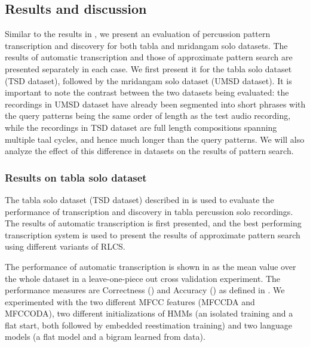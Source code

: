 \subsection{Results and discussion}
Similar to the results in , we present an evaluation of percussion pattern transcription and discovery for both \gls{tabla} and mridangam solo datasets. The results of automatic transcription and those of approximate pattern search are presented separately in each case. We first present it for the \gls{tabla} solo dataset (\acrshort{TSD} dataset), followed by the mridangam solo dataset (\acrshort{UMSD} dataset). It is important to note the contrast between the two datasets being evaluated: the recordings in \acrshort{UMSD} dataset have already been segmented into short phrases with the query patterns being the same order of length as the test audio recording, while the recordings in \acrshort{TSD} dataset are full length compositions spanning multiple \gls{taal} cycles, and hence much longer than the query patterns. We will also analyze the effect of this difference in datasets on the results of pattern search. 
% 
\subsubsection{Results on \gls{tabla} solo dataset}
The \gls{tabla} solo dataset (\acrshort{TSD} dataset) described in  is used to evaluate the performance of transcription and discovery in \gls{tabla} percussion solo recordings. The results of automatic transcription is first presented, and the best performing transcription system is used to present the results of approximate pattern search using different variants of \gls{RLCS}. 

The performance of automatic transcription is shown in  as the mean value over the whole dataset in a leave-one-piece out cross validation experiment. The performance measures are Correctness (\corrMeas) and Accuracy (\accuMeas) as defined in . We experimented with the two different \gls{MFCC} features (\acrshort{MFCCDA} and \acrshort{MFCCODA}), two different initializations of \glspl{HMM} (an isolated training and a flat start, both followed by embedded reestimation training) and two language models (a flat model and a bigram learned from data). 

